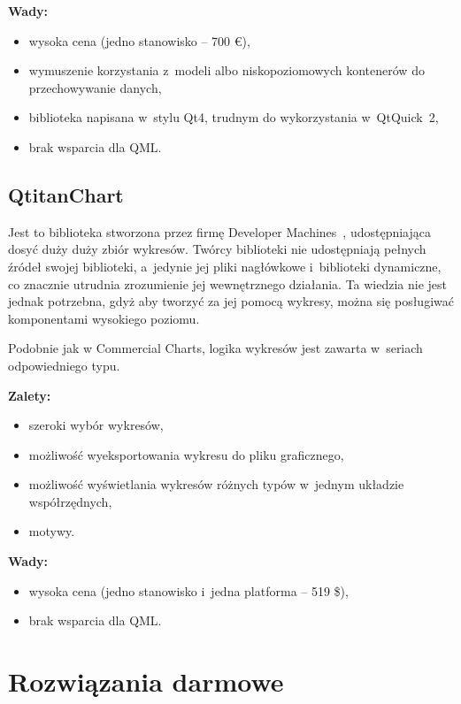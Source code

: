 \textbf{Wady:}
\begin{itemize}
\item{wysoka cena (jedno stanowisko -- 700 \euro),}
\item{wymuszenie korzystania z~modeli albo niskopoziomowych kontenerów do przechowywanie danych,}
\item{biblioteka napisana w~stylu Qt4, trudnym do wykorzystania w~QtQuick~2,}
\item{brak wsparcia dla QML.}
\end{itemize}

\subsection{QtitanChart}
Jest to biblioteka stworzona przez firmę Developer Machines~\cite{dev-machines}, udostępniająca dosyć duży duży zbiór wykresów. Twórcy biblioteki nie udostępniają pełnych źródeł swojej biblioteki, a~jedynie jej pliki nagłówkowe i~biblioteki dynamiczne, co znacznie utrudnia zrozumienie jej wewnętrznego działania. Ta wiedzia nie jest jednak potrzebna, gdyż aby tworzyć za jej pomocą wykresy, można się posługiwać komponentami wysokiego poziomu.\newline

Podobnie jak w Commercial Charts, logika wykresów jest zawarta w~seriach odpowiedniego typu.\newline

\textbf{Zalety:}
\begin{itemize}
\item{szeroki wybór wykresów,}
\item{możliwość wyeksportowania wykresu do pliku graficznego,}
\item{możliwość wyświetlania wykresów różnych typów w~jednym układzie współrzędnych,}
\item{motywy.}\newline
\end{itemize}

\textbf{Wady:}
\begin{itemize}
\item{wysoka cena (jedno stanowisko i~jedna platforma -- 519 \$),}
\item{brak wsparcia dla QML.}
\end{itemize}


\section{Rozwiązania darmowe} 
